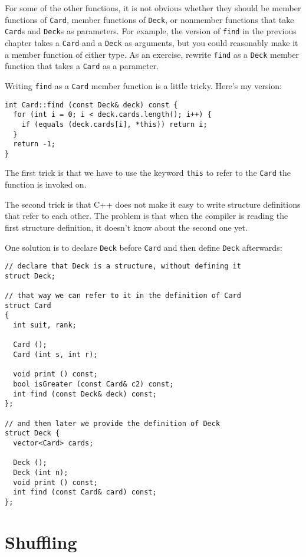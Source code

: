 For some of the other functions, it is not obvious whether they should
be member functions of {\tt Card}, member functions of {\tt Deck}, or
nonmember functions that take {\tt Card}s and {\tt Deck}s as parameters.
For example, the version of {\tt find} in the previous chapter
takes a {\tt Card} and a {\tt Deck} as arguments, but you could
reasonably make it a member function of either type.  As an exercise,
rewrite {\tt find} as a {\tt Deck} member function that takes
a {\tt Card} as a parameter.

Writing {\tt find} as a {\tt Card} member
function is a little tricky.  Here's my version:

\begin{verbatim}
int Card::find (const Deck& deck) const {
  for (int i = 0; i < deck.cards.length(); i++) {
    if (equals (deck.cards[i], *this)) return i;
  }
  return -1;
}
\end{verbatim}
%
The first trick is that we have to use the keyword {\tt this}
to refer to the {\tt Card} the function is invoked on.


The second trick is that C++ does not make it easy to write
structure definitions that refer to each other.  The problem
is that when the compiler is reading the first structure
definition, it doesn't know about the second one yet.

One solution is to declare {\tt Deck} before {\tt Card} and
then define {\tt Deck} afterwards:

\begin{verbatim}
// declare that Deck is a structure, without defining it
struct Deck;

// that way we can refer to it in the definition of Card
struct Card
{
  int suit, rank;

  Card ();
  Card (int s, int r);

  void print () const;
  bool isGreater (const Card& c2) const;
  int find (const Deck& deck) const;
};

// and then later we provide the definition of Deck
struct Deck {
  vector<Card> cards;

  Deck ();
  Deck (int n);
  void print () const;
  int find (const Card& card) const;
};
\end{verbatim}


\section{Shuffling}
\label{shuffle}

